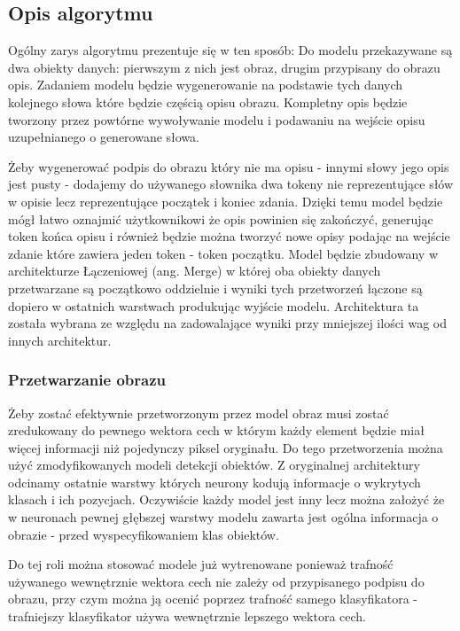 \subsection{Opis algorytmu}
Ogólny zarys algorytmu prezentuje się w ten sposób: Do modelu przekazywane są dwa obiekty danych: pierwszym z nich jest obraz, drugim przypisany do obrazu opis. Zadaniem modelu będzie wygenerowanie na podstawie tych danych kolejnego słowa które będzie częścią opisu obrazu. Kompletny opis będzie tworzony przez powtórne wywoływanie modelu i podawaniu na wejście opisu uzupełnianego o generowane słowa. 

Żeby wygenerować podpis do obrazu który nie ma opisu - innymi słowy jego opis jest pusty - dodajemy do używanego słownika dwa tokeny nie reprezentujące słów w opisie lecz reprezentujące początek i koniec zdania. Dzięki temu model będzie mógł łatwo oznajmić użytkownikowi że opis powinien się zakończyć, generując token końca opisu i również będzie można tworzyć nowe opisy podając na wejście zdanie które zawiera jeden token - token początku.
Model będzie zbudowany w architekturze Łączeniowej (ang. Merge) w której oba obiekty danych przetwarzane są początkowo oddzielnie i wyniki tych przetworzeń łączone są dopiero w ostatnich warstwach produkując wyjście modelu. Architektura ta została wybrana ze względu na zadowalające wyniki przy mniejszej ilości wag od innych architektur.\cite[p.~25]{rnn-in-captiongen}
\subsubsection{Przetwarzanie obrazu}
Żeby zostać efektywnie przetworzonym przez model obraz musi zostać zredukowany do pewnego wektora cech w którym każdy element będzie miał więcej informacji niż pojedynczy piksel oryginału. Do tego przetworzenia można użyć zmodyfikowanych modeli detekcji obiektów. Z oryginalnej architektury odcinamy ostatnie warstwy których neurony kodują informacje o wykrytych klasach i ich pozycjach. Oczywiście każdy model jest inny lecz można założyć że w neuronach pewnej głębszej warstwy modelu zawarta jest ogólna informacja o obrazie - przed wyspecyfikowaniem klas obiektów.

Do tej roli można stosować modele już wytrenowane ponieważ trafność używanego wewnętrznie wektora cech nie zależy od przypisanego podpisu do obrazu, przy czym można ją ocenić poprzez trafność samego klasyfikatora - trafniejszy klasyfikator używa wewnętrznie lepszego wektora cech.
